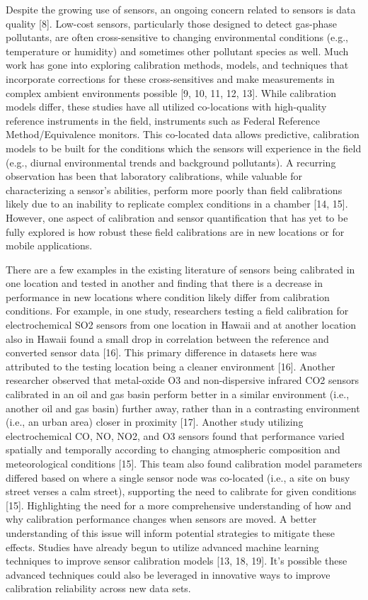 \documentclass[journal abbreviation, manuscript]{copernicus}
\begin{document}
Despite the growing use of sensors, an ongoing concern related to sensors is data quality [8]. Low-cost sensors, particularly those designed to detect gas-phase pollutants, are often cross-sensitive to changing environmental conditions (e.g., temperature or humidity) and sometimes other pollutant species as well.  Much work has gone into exploring calibration methods, models, and techniques that incorporate corrections for these cross-sensitives and make measurements in complex ambient environments possible [9, 10, 11, 12, 13]. While calibration models differ, these studies have all utilized co-locations with high-quality reference instruments in the field, instruments such as Federal Reference Method/Equivalence monitors. This co-located data allows predictive, calibration models to be built for the conditions which the sensors will experience in the field (e.g., diurnal environmental trends and background pollutants). A recurring observation has been that laboratory calibrations, while valuable for characterizing a sensor’s abilities, perform more poorly than field calibrations likely due to an inability to replicate complex conditions in a chamber [14, 15]. However, one aspect of calibration and sensor quantification that has yet to be fully explored is how robust these field calibrations are in new locations or for mobile applications.

There are a few examples in the existing literature of sensors being calibrated in one location and tested in another and finding that there is a decrease in performance in new locations where condition likely differ from calibration conditions. For example, in one study, researchers testing a field calibration for electrochemical SO2 sensors from one location in Hawaii and at another location also in Hawaii found a small drop in correlation between the reference and converted sensor data [16]. This primary difference in datasets here was attributed to the testing location being a cleaner environment [16]. Another researcher observed that metal-oxide O3 and non-dispersive infrared CO2 sensors calibrated in an oil and gas basin perform better in a similar environment (i.e., another oil and gas basin) further away, rather than in a contrasting environment (i.e., an urban area) closer in proximity [17]. Another study utilizing electrochemical CO, NO, NO2, and O3 sensors found that performance varied spatially and temporally according to changing atmospheric composition and meteorological conditions [15]. This team also found calibration model parameters differed based on where a single sensor node was co-located (i.e., a site on busy street verses a calm street), supporting the need to calibrate for given conditions [15]. Highlighting the need for a more comprehensive understanding of how and why calibration performance changes when sensors are moved. A better understanding of this issue will inform potential strategies to mitigate these effects. Studies have already begun to utilize advanced machine learning techniques to improve sensor calibration models [13, 18, 19]. It’s possible these advanced techniques could also be leveraged in innovative ways to improve calibration reliability across new data sets. 
 
\end{document}
